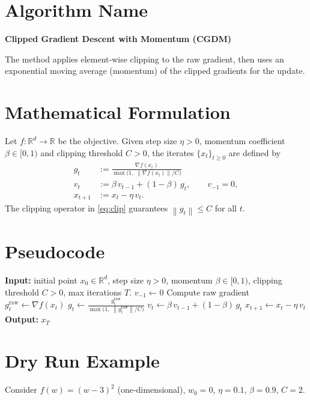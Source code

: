 \documentclass[11pt]{article}
\newcommand{\norm}[1]{\left\lVert #1\right\rVert}
\newcommand{\grad}{\nabla}
\begin{document}
\section*{Algorithm Name}
\textbf{Clipped Gradient Descent with Momentum (CGDM)}  

The method applies element‑wise clipping to the raw gradient, then uses an exponential moving average (momentum) of the clipped gradients for the update.

\section*{Mathematical Formulation}
Let $f:\mathbb{R}^d\rightarrow\mathbb{R}$ be the objective.  
Given step size $\eta>0$, momentum coefficient $\beta\in[0,1)$ and clipping threshold $C>0$, the iterates $\{x_t\}_{t\ge 0}$ are defined by
\begin{align}
    g_t &:= \frac{\grad f(x_t)}{\max\!\bigl(1,\;\norm{\grad f(x_t)}/C\bigr)} \label{eq:clip}\\[4pt]
    v_t &:= \beta\,v_{t-1} + (1-\beta)\,g_t, \qquad v_{-1}=0, \label{eq:momentum}\\[4pt]
    x_{t+1} &:= x_t - \eta\, v_t . \label{eq:update}
\end{align}
The clipping operator in \eqref{eq:clip} guarantees $\norm{g_t}\le C$ for all $t$.

\section*{Pseudocode}
\begin{algorithm}[H]
\caption{Clipped Gradient Descent with Momentum (CGDM)}
\begin{algorithmic}[1]
\State \textbf{Input:} initial point $x_0\in\mathbb{R}^d$, step size $\eta>0$, momentum $\beta\in[0,1)$, clipping threshold $C>0$, max iterations $T$.
\State $v_{-1}\gets 0$
    \State Compute raw gradient $g^{\text{raw}}_t \gets \grad f(x_t)$
    \State $\displaystyle g_t \gets \frac{g^{\text{raw}}_t}{\max\!\bigl(1,\;\norm{g^{\text{raw}}_t}/C\bigr)}$ 
    \State $v_t \gets \beta\,v_{t-1} + (1-\beta)\,g_t$ 
    \State $x_{t+1} \gets x_t - \eta\,v_t$ 
\EndFor
\State \textbf{Output:} $x_T$
\end{algorithmic}
\end{algorithm}

\section*{Dry Run Example}
Consider $f(w)=(w-3)^2$ (one‑dimensional), $w_0=0$, $\eta=0.1$, $\beta=0.9$, $C=2$.
\end{document}
